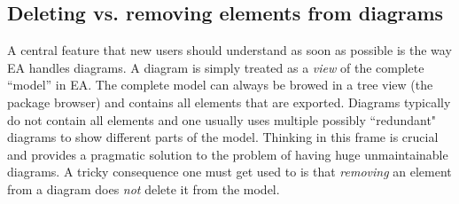 \subsection{Deleting vs. removing elements from diagrams} 

A central feature that new users should understand as soon as possible is the way EA handles diagrams. A diagram is simply treated as a \emph{view} of the
complete ``model'' in EA. The complete model can always be browed in a tree view (the package browser) and contains all elements that are exported. Diagrams
typically do not contain all elements and one usually uses multiple possibly ``redundant" diagrams to show different parts of the model. Thinking in this frame
is crucial and provides a pragmatic solution to the problem of having huge unmaintainable diagrams. A tricky consequence one must get used to is that
\emph{removing} an element from a diagram does \emph{not} delete it from the model.

